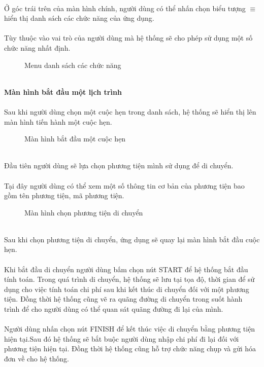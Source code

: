 \documentclass[a4paper]{article}
\begin{document}
\\
Ở góc trái trên của màn hình chính, người dùng có thể nhấn chọn biểu tượng $\equiv$ hiển thị danh sách các chức năng của ứng dụng.\\\\
Tùy thuộc vào vai trò của người dùng mà hệ thống sẽ cho phép sử dụng một số chức năng nhất định.\\
\begin{figure}[!h]
    \centering
    \caption{Menu danh sách các chức năng}
    \label{fig:ui_employee_list}
\end{figure} 
\\
\textbf{Màn hình bắt đầu một lịch trình}\\\\
Sau khi người dùng chọn một cuộc hẹn trong danh sách, hệ thống sẽ hiển thị lên màn hình tiến hành một cuộc hẹn.\\
\begin{figure}[!h]
    \centering
    \caption{Màn hình bắt đầu một cuộc hẹn}
    \label{fig:ui_employee_list}
\end{figure} 
\\
Đầu tiên người dùng sẽ lựa chọn phương tiện mình sử dụng để di chuyển.\\\\
Tại đây người dùng có thể xem một số thông tin cơ bản của phương tiện bao gồm tên phương tiện, mã phương tiện.\\
\begin{figure}[!h]
    \centering
    \caption{Màn hình chọn phương tiện di chuyển}
    \label{fig:ui_employee_list}
\end{figure} 
\\
Sau khi chọn phương tiện di chuyển, ứng dụng sẽ quay lại màn hình bắt đầu cuộc hẹn.\\\\
Khi bắt đầu di chuyển người dùng bấm chọn nút START để hệ thống bắt đầu tính toán. Trong quá trình di chuyển, hệ thống sẽ lưu tại tọa độ, thời gian để sử dụng cho việc tính toán chi phí sau khi kết thúc di chuyển đối với một phương tiện. Đồng thời hệ thống cũng vẽ ra quãng đường di chuyển trong suốt hành trình để cho người dùng có thể quan sát quãng đường đi lại của mình.\\\\
Người dùng nhấn chọn nút FINISH để kết thúc việc di chuyển bằng phương tiện hiện tại.Sau đó hệ thống sẽ bắt buộc người dùng nhập chi phí đi lại đối với phương tiện hiện tại. Đồng thời hệ thống cũng hỗ trợ chức năng chụp và gửi hóa đơn về cho hệ thống.\\
\end{document}
